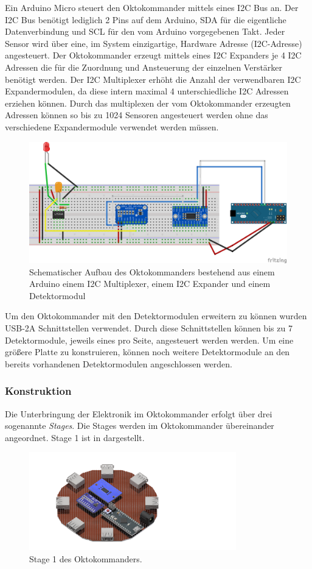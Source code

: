Ein Arduino Micro steuert den Oktokommander mittels eines I2C Bus an. Der I2C Bus benötigt lediglich 2 Pins auf dem Arduino, SDA für die eigentliche Datenverbindung und SCL für den vom Arduino vorgegebenen Takt. Jeder Sensor wird über eine, im System einzigartige, Hardware Adresse (I2C-Adresse) angesteuert.
Der Oktokommander erzeugt mittels eines I2C Expanders je 4 I2C Adressen die für die Zuordnung und Ansteuerung der einzelnen Verstärker benötigt werden.
Der I2C Multiplexer erhöht die Anzahl der verwendbaren I2C Expandermodulen, da diese intern maximal 4 unterschiedliche I2C Adressen erziehen können. Durch das multiplexen der vom Oktokommander erzeugten Adressen können so bis zu 1024 Sensoren angesteuert werden ohne das verschiedene Expandermodule verwendet werden müssen. 
\begin{figure}[h]
	\centering
	\includegraphics[scale=0.5]{../figures/oktokommander.png}
	\caption{Schematischer Aufbau des Oktokommanders bestehend aus einem Arduino einem I2C Multiplexer, einem I2C Expander und einem Detektormodul}
	\label{fig:oktokommander}
\end{figure}
Um den Oktokommander mit den Detektormodulen erweitern zu können wurden USB-2A Schnittstellen verwendet. Durch diese Schnittstellen können bis zu 7 Detektormodule, jeweils eines pro Seite, angesteuert werden werden. Um eine größere Platte zu konstruieren, können noch weitere Detektormodule an den bereits vorhandenen Detektormodulen angeschlossen werden.


\subsubsection*{Konstruktion}
Die Unterbringung der Elektronik im Oktokommander erfolgt über drei sogenannte \textit{Stages}. Die Stages werden im Oktokommander übereinander angeordnet. Stage 1 ist in  dargestellt.

\begin{figure}[h]
	\centering
	\includegraphics[width=9cm]{../CAD_Bilder/OktagonElektronik_Stage1_raytraced.png}
	\caption{Stage 1 des Oktokommanders.}
	\label{fig:OktoStage1}
\end{figure}

